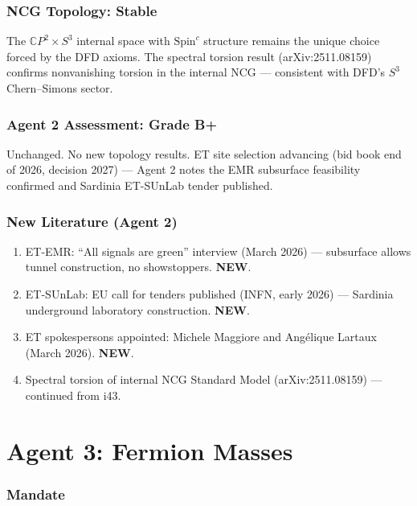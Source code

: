 \documentclass[11pt,a4paper]{article}
\newcommand{\NEW}{\textcolor{dfdblue}{\textbf{NEW}}}
\newcommand{\CP}{\mathbb{C}P}
\begin{document}
\section{NCG Topology: Stable}

The $\CP^2 \times S^3$ internal space with $\text{Spin}^c$ structure remains the unique choice forced by the DFD axioms. The spectral torsion result (arXiv:2511.08159) confirms nonvanishing torsion in the internal NCG --- consistent with DFD's $S^3$ Chern--Simons sector.

\section{Agent 2 Assessment: Grade B+}

Unchanged. No new topology results. ET site selection advancing (bid book end of 2026, decision 2027) --- Agent 2 notes the EMR subsurface feasibility confirmed and Sardinia ET-SUnLab tender published.

\section{New Literature (Agent 2)}

\begin{enumerate}
\item ET-EMR: ``All signals are green'' interview (March 2026) --- subsurface allows tunnel construction, no showstoppers. \NEW.
\item ET-SUnLab: EU call for tenders published (INFN, early 2026) --- Sardinia underground laboratory construction. \NEW.
\item ET spokespersons appointed: Michele Maggiore and Ang\'elique Lartaux (March 2026). \NEW.
\item Spectral torsion of internal NCG Standard Model (arXiv:2511.08159) --- continued from i43.
\end{enumerate}


\part{Agent 3: Fermion Masses}
\label{part:agent3}

\section{Mandate}
\end{document}
